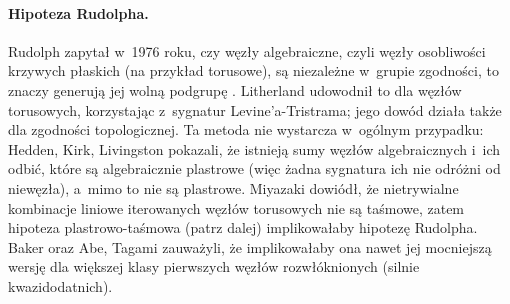 \paragraph{Hipoteza Rudolpha.}
Rudolph zapytał w~1976 roku, czy węzły algebraiczne, czyli węzły osobliwości krzywych płaskich (na przykład torusowe), są niezależne w~grupie zgodności, to znaczy generują jej wolną podgrupę \cite[problem 1.39]{baykur2026}.
Litherland \cite{litherland1979} udowodnił to dla węzłów torusowych, korzystając z~sygnatur Levine'a-Tristrama; jego dowód działa także dla zgodności topologicznej.
%
%
%
Ta metoda nie wystarcza w~ogólnym przypadku: Hedden, Kirk, Livingston \cite{hedden2012} pokazali, że istnieją sumy węzłów algebraicznych i~ich odbić, które są algebraicznie plastrowe (więc żadna sygnatura ich nie odróżni od niewęzła), a~mimo to nie są plastrowe.
%
Miyazaki \cite{miyazaki1994} dowiódł, że nietrywialne kombinacje liniowe iterowanych węzłów torusowych nie są taśmowe, zatem hipoteza plastrowo-taśmowa (patrz dalej) implikowałaby hipotezę Rudolpha.
%
Baker \cite{baker2016} oraz Abe, Tagami \cite{abe2016} zauważyli, że implikowałaby ona nawet jej mocniejszą wersję dla większej klasy pierwszych węzłów rozwłóknionych (silnie kwazidodatnich).
%
%
%
